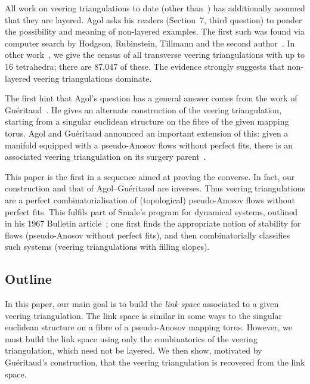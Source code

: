 \documentclass[12pt]{amsart}
\begin{document}
All work on veering triangulations to date (other than~\cite{HRST11, FuterGueritaud13}) has additionally assumed that they are layered.  Agol asks his readers (Section~7, third question) to ponder the possibility and meaning of non-layered examples.  The first such was found via computer search by Hodgson, Rubinstein, Tillmann and the second author~\cite{HRST11}.  In other work~\cite{GSS19}, we give the census of all transverse veering triangulations with up to 16 tetrahedra; there are 87,047 of these. The evidence strongly suggests that non-layered veering triangulations dominate. 



The first hint that Agol's question has a general answer comes from the work of Gu\'eritaud~\cite[Theorem~1.1]{Gueritaud16}.  He gives an alternate construction of the veering triangulation, starting from a singular euclidean structure on the fibre of the given mapping torus.  Agol and Gu\'eritaud announced an important extension of this: given a manifold equipped with a pseudo-Anosov flows without perfect fits, there is an associated veering triangulation on its surgery parent~\cite{Agol15}. 

This paper is the first in a sequence aimed at proving the converse.  In fact, our construction and that of Agol--Gu\'eritaud are inverses. Thus veering triangulations are a perfect combinatorialisation of (topological) pseudo-Anosov flows without perfect fits. This fulfils part of Smale's program for dynamical systems, outlined in his 1967 Bulletin article~\cite{Smale67}; one first finds the appropriate notion of stability for flows (pseudo-Anosov without perfect fits), and then combinatorially classifies such systems (veering triangulations with filling slopes). 

\subsection{Outline}

In this paper, our main goal is to build the \emph{link space} associated to a given veering triangulation.
The link space is similar in some ways to the singular euclidean structure on a fibre of a pseudo-Anosov mapping torus.  
However, we must build the link space using only the combinatorics of the veering triangulation, which need not be layered.
We then show, motivated by Gu\'eritaud's construction, that the veering triangulation is recovered from the link space. 

\makeatletter
\g@addto@macro\@parboxrestore{\lineskiplimit\normallineskip}
\makeatother
\end{document}
